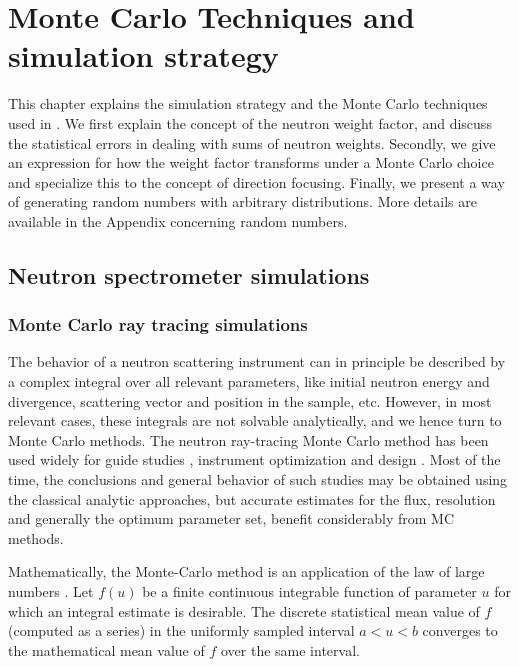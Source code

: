 \chapter{Monte Carlo Techniques and simulation strategy}
\label{s:MCtechniques}

This chapter explains the simulation strategy and the Monte Carlo
techniques used in \MCS. We first explain the concept of the neutron
weight factor, and discuss the statistical errors in dealing with sums
of neutron weights.  Secondly, we give an expression for how the weight
factor transforms under a Monte Carlo choice and specialize this
to the concept of direction focusing.  Finally, we present a way of
generating random numbers with arbitrary distributions.
More details are available in the Appendix concerning random numbers.


\section{Neutron spectrometer simulations}

\subsection{Monte Carlo ray tracing simulations}
The behavior of a neutron scattering instrument can in principle be described by a complex integral over all relevant parameters, like initial neutron energy and divergence, scattering vector and position in the sample, etc. However, in most relevant cases, these integrals are not solvable analytically, and we hence turn to Monte Carlo methods. The neutron ray-tracing Monte Carlo method has been used widely for guide studies \cite{Copley93,Farhi02,Schanzer04}, instrument optimization and design \cite{Zsigmond04,Lieutenant05}. Most of the time, the conclusions and general behavior of such studies may be obtained using the classical analytic approaches, but accurate estimates for the flux, resolution and generally the optimum parameter set, benefit considerably from MC methods.

Mathematically, the Monte-Carlo method is an application of the law of large numbers \cite{James80,Grimmett92}. Let $f(u)$ be a finite continuous integrable function of parameter $u$ for which an integral estimate is desirable. The discrete statistical mean value of $f$ (computed as a series) in the uniformly sampled interval $a < u < b$ converges to the mathematical mean value of $f$ over the same interval.

